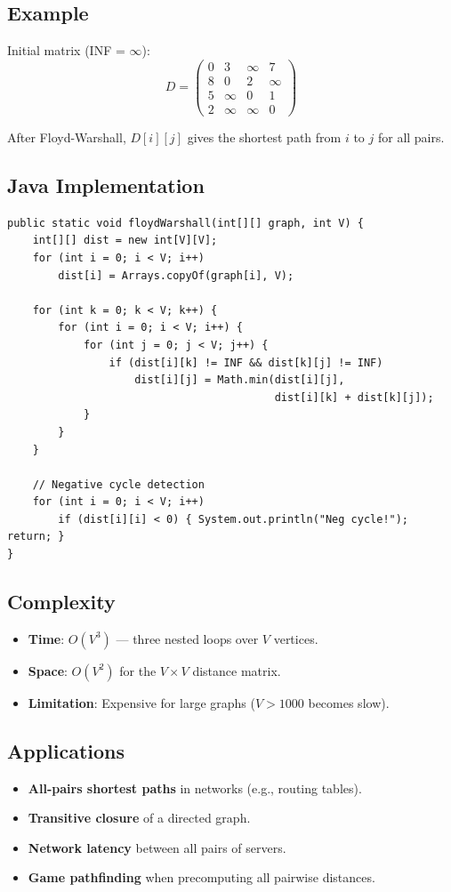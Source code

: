 \documentclass[12pt,a4paper]{article}
\begin{document}
\subsection{Example}

Initial matrix (INF = $\infty$):
\[
D = \begin{pmatrix} 0 & 3 & \infty & 7 \\ 8 & 0 & 2 & \infty \\ 5 & \infty & 0 & 1 \\ 2 & \infty & \infty & 0 \end{pmatrix}
\]

After Floyd-Warshall, $D[i][j]$ gives the shortest path from $i$ to $j$ for all pairs.

\subsection{Java Implementation}
\begin{lstlisting}[style=javastyle, caption={Floyd-Warshall Algorithm — Java}]
public static void floydWarshall(int[][] graph, int V) {
    int[][] dist = new int[V][V];
    for (int i = 0; i < V; i++)
        dist[i] = Arrays.copyOf(graph[i], V);

    for (int k = 0; k < V; k++) {
        for (int i = 0; i < V; i++) {
            for (int j = 0; j < V; j++) {
                if (dist[i][k] != INF && dist[k][j] != INF)
                    dist[i][j] = Math.min(dist[i][j],
                                          dist[i][k] + dist[k][j]);
            }
        }
    }

    // Negative cycle detection
    for (int i = 0; i < V; i++)
        if (dist[i][i] < 0) { System.out.println("Neg cycle!"); return; }
}
\end{lstlisting}

\subsection{Complexity}
\begin{itemize}
    \item \textbf{Time}: $O(V^3)$ — three nested loops over $V$ vertices.
    \item \textbf{Space}: $O(V^2)$ for the $V \times V$ distance matrix.
    \item \textbf{Limitation}: Expensive for large graphs ($V > 1000$ becomes slow).
\end{itemize}

\subsection{Applications}
\begin{itemize}
    \item \textbf{All-pairs shortest paths} in networks (e.g., routing tables).
    \item \textbf{Transitive closure} of a directed graph.
    \item \textbf{Network latency} between all pairs of servers.
    \item \textbf{Game pathfinding} when precomputing all pairwise distances.
\end{itemize}
\end{document}
